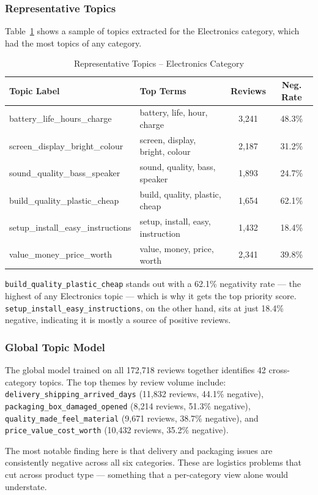 \subsubsection{Representative Topics}
\begin{justify}
Table~\ref{tab:sample_topics} shows a sample of topics extracted for the Electronics category, which had the most topics of any category.

\begin{table}[H]
\centering
\caption{Representative Topics -- Electronics Category}
\renewcommand{\arraystretch}{1.2}
\begin{tabular}{|l|l|c|c|}
\hline
\textbf{Topic Label} & \textbf{Top Terms} & \textbf{Reviews} & \textbf{Neg. Rate} \\
\hline
battery\_life\_hours\_charge & battery, life, hour, charge & 3,241 & 48.3\% \\
\hline
screen\_display\_bright\_colour & screen, display, bright, colour & 2,187 & 31.2\% \\
\hline
sound\_quality\_bass\_speaker & sound, quality, bass, speaker & 1,893 & 24.7\% \\
\hline
build\_quality\_plastic\_cheap & build, quality, plastic, cheap & 1,654 & 62.1\% \\
\hline
setup\_install\_easy\_instructions & setup, install, easy, instruction & 1,432 & 18.4\% \\
\hline
value\_money\_price\_worth & value, money, price, worth & 2,341 & 39.8\% \\
\hline
\end{tabular}
\label{tab:sample_topics}
\end{table}

\texttt{build\_quality\_plastic\_cheap} stands out with a 62.1\% negativity rate — the highest of any Electronics topic — which is why it gets the top priority score. \texttt{setup\_install\_easy\_instructions}, on the other hand, sits at just 18.4\% negative, indicating it is mostly a source of positive reviews.
\end{justify}

\subsubsection{Global Topic Model}
\begin{justify}
The global model trained on all 172,718 reviews together identifies 42 cross-category topics. The top themes by review volume include: \texttt{delivery\_shipping\_arrived\_days} (11,832 reviews, 44.1\% negative), \texttt{packaging\_box\_damaged\_opened} (8,214 reviews, 51.3\% negative), \texttt{quality\_made\_feel\_material} (9,671 reviews, 38.7\% negative), and \texttt{price\_value\_cost\_worth} (10,432 reviews, 35.2\% negative).

The most notable finding here is that delivery and packaging issues are consistently negative across all six categories. These are logistics problems that cut across product type — something that a per-category view alone would understate.
\end{justify}

